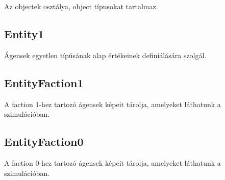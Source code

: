 Az objectek osztálya, object típusokat tartalmaz.

\subsection{Entity1}

Ágensek egyetlen típúsának alap értékeinek definiálására szolgál.

\subsection{EntityFaction1}

A faction 1-hez tartozó ágensek képeit tárolja, amelyeket láthatunk a szimulációban.

\subsection{EntityFaction0}

A faction 0-hez tartozó ágensek képeit tárolja, amelyeket láthatunk a szimulációban.


